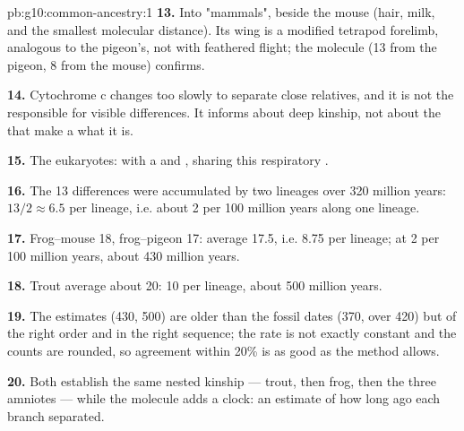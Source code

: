 \begin{solution}{pb:g10:common-ancestry:1}
\textbf{13.} Into "mammals", beside the mouse (hair, milk, and the
smallest molecular distance). Its wing is a modified tetrapod
forelimb, analogous to the pigeon's, not  with feathered
flight; the molecule (13 from the pigeon, 8 from the mouse) confirms.

\textbf{14.} Cytochrome c changes too slowly to separate close
relatives, and it is not the  responsible for visible differences.
It informs about deep kinship, not about the  that make a 
what it is.

\textbf{15.} The eukaryotes:  with a  and ,
sharing this respiratory .

\textbf{16.} The 13 differences were accumulated by two lineages over
320 million years: $13/2 \approx 6.5$ per lineage, i.e. about 2 per
100 million years along one lineage.

\textbf{17.} Frog--mouse 18, frog--pigeon 17: average 17.5, i.e. 8.75
per lineage; at 2 per 100 million years, about 430 million years.

\textbf{18.} Trout average about 20: 10 per lineage, about 500 million
years.

\textbf{19.} The estimates (430, 500) are older than the fossil dates
(370, over 420) but of the right order and in the right sequence; the
rate is not exactly constant and the counts are rounded, so agreement
within 20\% is as good as the method allows.

\textbf{20.} Both establish the same nested kinship --- trout, then
frog, then the three amniotes --- while the molecule adds a clock: an
estimate of how long ago each branch separated.
\end{solution}
